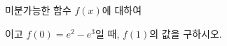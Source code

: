 미분가능한 함수 $f(x)$에 대하여 \par\smallskip{}\par\smallskip\noindent 이고 $f(0)=e^2-e^3$일 때, $f(1)$의 값을 구하시오.
